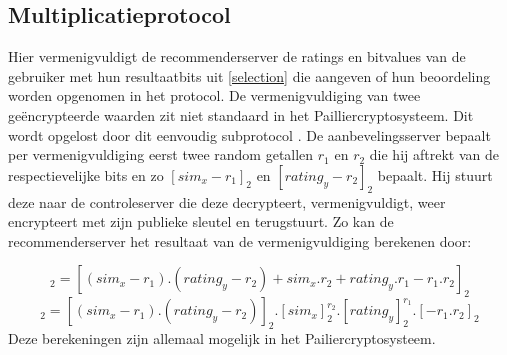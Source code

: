 \pagebreak
\subsection{Multiplicatieprotocol}
\label{multiplication} 
Hier vermenigvuldigt de recommenderserver de ratings en bitvalues van de gebruiker met hun resultaatbits uit \ref{selection} die aangeven of hun beoordeling worden opgenomen in het protocol. De vermenigvuldiging van twee ge\"encrypteerde waarden zit niet standaard in het Pailliercryptosysteem. Dit wordt opgelost door dit eenvoudig subprotocol \cite{erkin:generating}. De aanbevelingsserver bepaalt per vermenigvuldiging eerst twee random getallen $r_1$ en $r_2$ die hij aftrekt van de respectievelijke bits en zo $[sim_x - r_1]_2$ en $[rating_y - r_2]_2$ bepaalt. Hij stuurt deze naar de controleserver die deze decrypteert, vermenigvuldigt, weer encrypteert met zijn publieke sleutel en terugstuurt. Zo kan de recommenderserver het resultaat van de vermenigvuldiging berekenen door:

\begin{equation}
[sim_x.rating_y]_2=[(sim_x-r_1).(rating_y-r_2) + sim_x.r_2 + rating_y.r_1 - r_1.r_2]_2
\end{equation}
\begin{equation}
[sim_x.rating_y]_2= [(sim_x-r_1).(rating_y-r_2)]_2 . [sim_x]_2^{r_2} . [rating_y]_2^{r_1}.[-r_1.r_2]_2
\end{equation}
Deze berekeningen zijn allemaal mogelijk in het Pailiercryptosysteem.